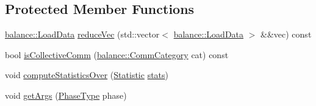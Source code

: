 \subsection*{Protected Member Functions}
\begin{DoxyCompactItemize}
\item 
\hyperlink{structvt_1_1vrt_1_1collection_1_1balance_1_1_load_data}{balance\+::\+Load\+Data} \hyperlink{structvt_1_1vrt_1_1collection_1_1lb_1_1_base_l_b_aa88f0500376340c2b83d35fb03f0ba9e}{reduce\+Vec} (std\+::vector$<$ \hyperlink{structvt_1_1vrt_1_1collection_1_1balance_1_1_load_data}{balance\+::\+Load\+Data} $>$ \&\&vec) const
\item 
bool \hyperlink{structvt_1_1vrt_1_1collection_1_1lb_1_1_base_l_b_ab13d4ad9a3523ef5416ea4f3558a06df}{is\+Collective\+Comm} (\hyperlink{namespacevt_1_1vrt_1_1collection_1_1balance_a9cc6c6884ca0416dae824e9204093c57}{balance\+::\+Comm\+Category} cat) const
\item 
void \hyperlink{structvt_1_1vrt_1_1collection_1_1lb_1_1_base_l_b_aa1f71784724c125fbf25cfc1c0e90cac}{compute\+Statistics\+Over} (\hyperlink{namespacevt_1_1vrt_1_1collection_1_1lb_af0e20ef9afee77295053aa83bf1348b1}{Statistic} \hyperlink{structvt_1_1vrt_1_1collection_1_1lb_1_1_base_l_b_a249359351566423733a7391dcdc2e203}{stats})
\item 
void \hyperlink{structvt_1_1vrt_1_1collection_1_1lb_1_1_base_l_b_a4ec045a3c6231d055b6e851de3016bba}{get\+Args} (\hyperlink{namespacevt_a46ce6733d5cdbd735d561b7b4029f6d7}{Phase\+Type} phase)
\end{DoxyCompactItemize}
